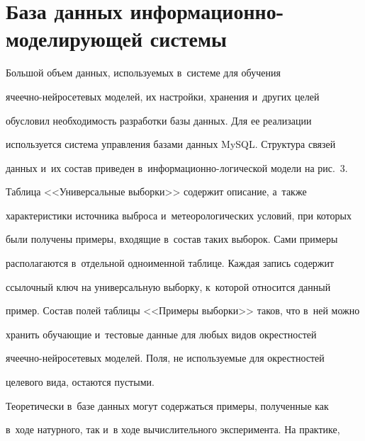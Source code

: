   





\vspace*{-6pt}





  \section{База данных информационно-моделирующей системы}


  


  Большой объем данных, используемых в~системе для обучения  


яче\-еч\-но-ней\-ро\-се\-те\-вых моделей, их настройки, хранения и~других целей 


обусловил необходимость разработки базы данных. Для ее реализации 


используется система управ\-ле\-ния базами данных MySQL. Структура связей 


данных и~их состав приведен в~информационно-логической модели на рис.~3.








   


  Таблица <<Универсальные выборки>> содержит описание, а~также 


характеристики источника выброса и~метеорологических условий, при которых 


были получены примеры, входящие в~состав таких выборок. Сами примеры 


располагаются в~отдельной одноименной таб\-ли\-це. Каждая запись содержит 


ссылочный ключ на универсальную выборку, к~которой относится данный 


пример. Со\-став полей таб\-ли\-цы <<Примеры выборки>> таков, что в~ней можно 


хранить обучающие и~тестовые данные для любых видов окрестностей 


яче\-еч\-но-ней\-ро\-се\-те\-вых моделей. Поля, не используемые для окрестностей 


целевого вида, остаются пустыми.


  


  Теоретически в~базе данных могут содержаться примеры, полученные как 


в~ходе натурного, так и~в ходе вычислительного эксперимента. На практике, 



